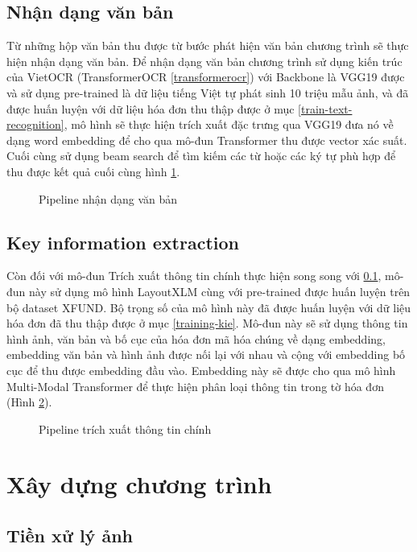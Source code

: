 \subsection{Nhận dạng văn bản} \label{method-rec}
Từ những hộp văn bản thu được từ bước phát hiện văn bản chương trình sẽ thực hiện nhận dạng văn bản. Để nhận dạng văn bản chương trình sử dụng kiến trúc của VietOCR (TransformerOCR \ref{transformerocr}) với Backbone là VGG19 được và sử dụng pre-trained là dữ liệu tiếng Việt tự phát sinh 10 triệu mẫu ảnh, và đã được huấn luyện với dữ liệu hóa đơn thu thập được ở mục \ref{train-text-recognition}, mô hình sẽ thực hiện trích xuất đặc trưng qua VGG19 đưa nó về dạng word embedding để cho qua mô-đun Transformer thu được vector xác suất. Cuối cùng sử dụng beam search để tìm kiếm các từ hoặc các ký tự phù hợp để thu được kết quả cuối cùng hình \ref{pipeline-text-recognition}.
\begin{figure}[h]
    
    \centering
    \caption{Pipeline nhận dạng văn bản}
    \label{pipeline-text-recognition}
\end{figure}

\subsection{Key information extraction}
Còn đối với mô-đun Trích xuất thông tin chính thực hiện song song với \ref{method-rec}, mô-đun này sử dụng mô hình LayoutXLM cùng với pre-trained được huấn luyện trên bộ dataset XFUND. Bộ trọng số của mô hình này đã được huấn luyện với dữ liệu hóa đơn đã thu thập được ở mục \ref{training-kie}. Mô-đun này sẽ sử dụng thông tin hình ảnh, văn bản và bố cục của hóa đơn mã hóa chúng về dạng embedding, embedding văn bản và hình ảnh được nối lại với nhau và cộng với embedding bố cục để thu được embedding đầu vào. Embedding này sẽ được cho qua mô hình Multi-Modal Transformer để thực hiện phân loại thông tin trong tờ hóa đơn (Hình \ref{pipeline-kie}).
\begin{figure}
    
    \centering
    \caption{Pipeline trích xuất thông tin chính}
    \label{pipeline-kie}
\end{figure}
\newpage
\section{Xây dựng chương trình}
\subsection{Tiền xử lý ảnh}

